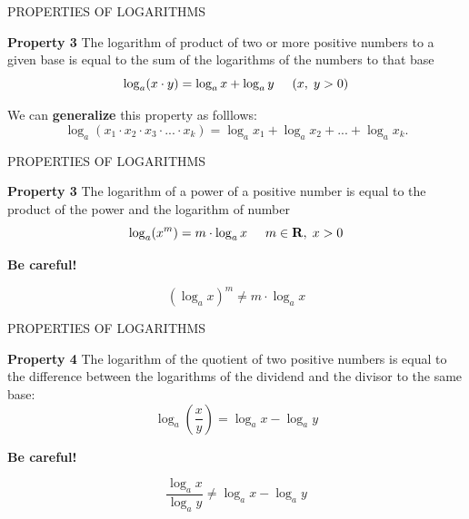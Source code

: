 \documentclass[xcolor=dvipsnames]{beamer}
\begin{document}
\begin{frame}{PROPERTIES OF LOGARITHMS}
\begin{alertblock}{\textbf{Property 3}}
The logarithm of product of two  or more positive numbers to a given base is equal to the sum of the logarithms of the numbers to that base
$$  \log_{a}(x\cdot y) =\log_{a}x + \log_{a}y \hspace{0.5 cm} (x,\hspace{0.1 cm}y >0)$$
 
We can \textbf{generalize} this property as folllows:
$$ \log_{a}(x_{1} \cdot x_{2} \cdot x_{3}\cdot ... \cdot x_{k}) =\log_{a}x_{1} + \log_{a}x_{2}+...+  \log_{a}x_{k}.$$
\end{alertblock}

\end{frame}
\begin{frame}{PROPERTIES OF LOGARITHMS}
    \begin{alertblock}{\textbf{Property 3}}
The logarithm of a power of a positive number is equal to the product of the power and the logarithm of number
$$  \log_{a}(x^{m}) =m\cdot \log_{a}x \hspace{0.5 cm} m\in \mathbf{R},\hspace{0.1 cm} x>0   $$
 
\begin{center}
    
\textbf{Be careful!}
\end{center}
$$(\log_{a} x)^{m} \ne m\cdot \log_{a}x$$
\end{alertblock}
\end{frame}
\begin{frame}{PROPERTIES OF LOGARITHMS}
   \begin{alertblock}{\textbf{Property 4}}
The logarithm of the quotient of two positive numbers is equal to the difference between the logarithms of the dividend and the divisor to the same base:
$$  \log_{a}\left(\frac{x}{y}\right) = \log_{a}x - \log_{a}y   $$
\begin{center}
    
\textbf{Be careful!}
\end{center}
$$\frac{\log_{a} x}{\log_{a}y} \ne   \log_{a}x - \log_{a}y $$
 
 
 
\end{alertblock}
\end{frame}
\end{document}
